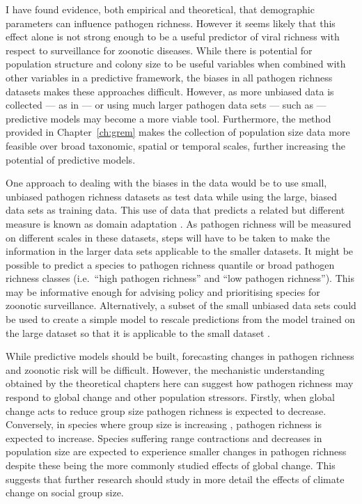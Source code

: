 I have found evidence, both empirical and theoretical, that demographic parameters can influence pathogen richness.
However it seems likely that this effect alone is not strong enough to be a useful predictor of viral richness with respect to surveillance for zoonotic diseases.
While there is potential for population structure and colony size to be useful variables when combined with other variables in a predictive framework, the biases in all pathogen richness datasets makes these approaches difficult.
However, as more unbiased data is collected --- as in \textcite{anthony2013strategy, anthony2015non} --- or using much larger pathogen data sets --- such as \textcite{wardeh2015database} --- predictive models may become a more viable tool.
Furthermore, the method provided in Chapter~\ref{ch:grem} makes the collection of population size data more feasible over broad taxonomic, spatial or temporal scales, further increasing the potential of predictive models.

One approach to dealing with the biases in the data would be to use small, unbiased pathogen richness datasets as test data while using the large, biased data sets as training data.
This use of data that predicts a related but different measure is known as domain adaptation \cite{daume2006domain, daume2009frustratingly}.
As pathogen richness will be measured on different scales in these datasets, steps will have to be taken to make the information in the larger data sets applicable to the smaller datasets.
It might be possible to predict a species to pathogen richness quantile or broad pathogen richness classes (i.e.\ ``high pathogen richness'' and ``low pathogen richness'').
This may be informative enough for advising policy and prioritising species for zoonotic surveillance.
Alternatively, a subset of the small unbiased data sets could be used to create a simple model to rescale predictions from the model trained on the large dataset so that it is applicable to the small dataset \cite{daume2009frustratingly}.

While predictive models should be built, forecasting changes in pathogen richness and zoonotic risk will be difficult.
However, the mechanistic understanding obtained by the theoretical chapters here can suggest how pathogen richness may respond to global change and other population stressors.
Firstly, when global change acts to reduce group size \cite{lehmann2010apes, zunino2007habitat, manor2003impact, atwood2006influence} pathogen richness is expected to decrease.
Conversely, in species where group size is increasing \cite{lehmann2010apes}, pathogen richness is expected to increase.
Species suffering range contractions \cite{thomas2004extinction} and decreases in population size \cite{craigie2010large} are expected to experience smaller changes in pathogen richness despite these being the more commonly studied effects of global change.
This suggests that further research should study in more detail the effects of climate change on social group size.

